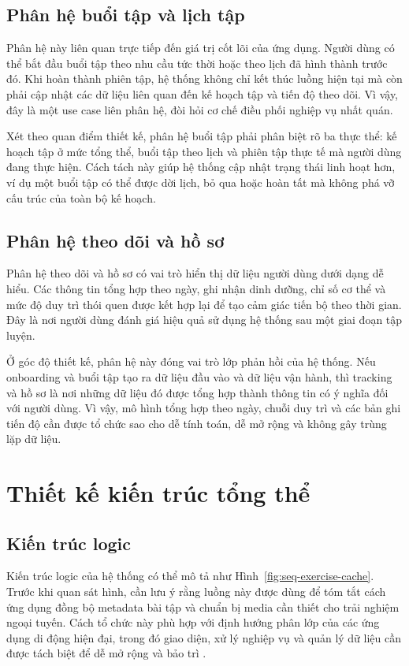\subsection{Phân hệ buổi tập và lịch tập}

Phân hệ này liên quan trực tiếp đến giá trị cốt lõi của ứng dụng. Người dùng có thể bắt đầu buổi tập theo nhu cầu tức thời hoặc theo lịch đã hình thành trước đó. Khi hoàn thành phiên tập, hệ thống không chỉ kết thúc luồng hiện tại mà còn phải cập nhật các dữ liệu liên quan đến kế hoạch tập và tiến độ theo dõi. Vì vậy, đây là một use case liên phân hệ, đòi hỏi cơ chế điều phối nghiệp vụ nhất quán.

Xét theo quan điểm thiết kế, phân hệ buổi tập phải phân biệt rõ ba thực thể: kế hoạch tập ở mức tổng thể, buổi tập theo lịch và phiên tập thực tế mà người dùng đang thực hiện. Cách tách này giúp hệ thống cập nhật trạng thái linh hoạt hơn, ví dụ một buổi tập có thể được dời lịch, bỏ qua hoặc hoàn tất mà không phá vỡ cấu trúc của toàn bộ kế hoạch.

\subsection{Phân hệ theo dõi và hồ sơ}

Phân hệ theo dõi và hồ sơ có vai trò hiển thị dữ liệu người dùng dưới dạng dễ hiểu. Các thông tin tổng hợp theo ngày, ghi nhận dinh dưỡng, chỉ số cơ thể và mức độ duy trì thói quen được kết hợp lại để tạo cảm giác tiến bộ theo thời gian. Đây là nơi người dùng đánh giá hiệu quả sử dụng hệ thống sau một giai đoạn tập luyện.

Ở góc độ thiết kế, phân hệ này đóng vai trò lớp phản hồi của hệ thống. Nếu onboarding và buổi tập tạo ra dữ liệu đầu vào và dữ liệu vận hành, thì tracking và hồ sơ là nơi những dữ liệu đó được tổng hợp thành thông tin có ý nghĩa đối với người dùng. Vì vậy, mô hình tổng hợp theo ngày, chuỗi duy trì và các bản ghi tiến độ cần được tổ chức sao cho dễ tính toán, dễ mở rộng và không gây trùng lặp dữ liệu.

\section{Thiết kế kiến trúc tổng thể}

\subsection{Kiến trúc logic}

Kiến trúc logic của hệ thống có thể mô tả như Hình~\ref{fig:seq-exercise-cache}. Trước khi quan sát hình, cần lưu ý rằng luồng này được dùng để tóm tắt cách ứng dụng đồng bộ metadata bài tập và chuẩn bị media cần thiết cho trải nghiệm ngoại tuyến. Cách tổ chức này phù hợp với định hướng phân lớp của các ứng dụng di động hiện đại, trong đó giao diện, xử lý nghiệp vụ và quản lý dữ liệu cần được tách biệt để dễ mở rộng và bảo trì \cite{android_jetpack,android_compose,android_navigation_compose,firebase_firestore}.

